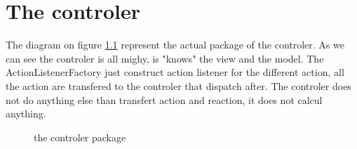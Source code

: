 \chapter{The controler}


The diagram on figure \ref{controler} represent the actual package of the controler.  As we can see the controler is all mighy, is "knows" the view and the model. The ActionListenerFactory just construct action listener for the different action, all the action are transfered to the controler that dispatch after. The controler does not do anything else than transfert action and reaction, it does not calcul anything. 


  \begin{figure}[h!]
  \centering
  \caption{the controler package}
\label{controler} 
 \end{figure}



\clearpage
